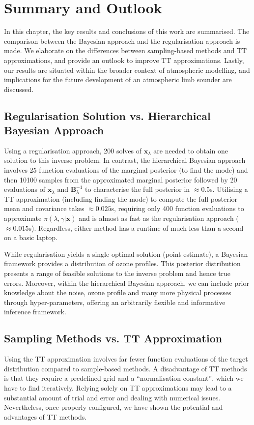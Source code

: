 \chapter{Summary and Outlook}
\label{ch:Concl}

In this chapter, the key results and conclusions of this work are summarised.
The comparison between the Bayesian approach and the regularisation approach is made.
We elaborate on the differences between sampling-based methods and TT approximations, and provide an outlook to improve TT approximations.
Lastly, our results are situated within the broader context of atmospheric modelling, and implications for the future development of an atmospheric limb sounder are discussed.




\section{Regularisation Solution vs. Hierarchical Bayesian Approach}
Using a regularisation approach, 200 solves of $\bm{x}_{\lambda}$ are needed to obtain one solution to this inverse problem.
In contrast, the hierarchical Bayesian approach involves 25 function evaluations of the marginal posterior (to find the mode) and then 10100 samples from the approximated marginal posterior followed by 20 evaluations of $\bm{x}_{\lambda}$ and $\bm{B}^{-1}_{\lambda}$ to characterise the full posterior in $\approx 0.5$s.
Utilising a TT approximation (including finding the mode) to compute the full posterior mean and covariance takes $\approx 0.025$s, requiring only 400 function evaluations to approximate $\pi(\lambda, \gamma | \bm{x})$ and is almost as fast as the regularisation approach ($\approx 0.015$s).
Regardless, either method has a runtime of much less than a second on a basic laptop.

While regularisation yields a single optimal solution (point estimate), a Bayesian framework provides a distribution of ozone profiles.
This posterior distribution presents a range of feasible solutions to the inverse problem and hence true errors.
Moreover, within the hierarchical Bayesian approach, we can include prior knowledge about the noise, ozone profile and many more physical processes through hyper-parameters, offering an arbitrarily flexible and informative inference framework.


\section{Sampling Methods vs. TT Approximation}
Using the TT approximation involves far fewer function evaluations of the target distribution compared to sample-based methods.
A disadvantage of TT methods is that they require a predefined grid and a ``normalisation constant'', which we have to find iteratively.
Relying solely on TT approximations may lead to a substantial amount of trial and error and dealing with numerical issues.
Nevertheless, once properly configured, we have shown the potential and advantages of TT methods.

